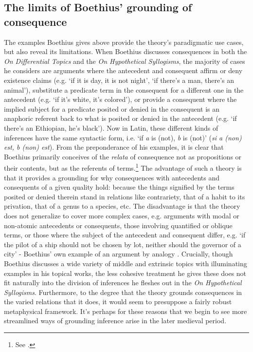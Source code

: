 \documentclass[a4paper, 11pt]{article}
\begin{document}
\subsection{The limits of Boethius' grounding of consequence}
The examples Boethius gives above provide the theory's paradigmatic use cases, but also reveal its limitations. When Boethius discusses consequences in both the \emph{On Differential Topics} and the \emph{On Hypothetical Syllogisms}, the majority of cases he considers are arguments where the antecedent and consequent affirm or deny existence claims (e.g. `if it is day, it is not night', `if there's a man, there's an animal'), substitute a predicate term in the consequent for a different one in the antecedent (e.g. `if it's white, it's colored'), or provide a consequent where the implied subject for a predicate posited or denied in the consequent is an anaphoric referent back to what is posited or denied in the antecedent (e.g. `if there's an Ethiopian, he's black'). Now in Latin, these different kinds of inferences have the same syntactic form, i.e.  `if \emph{a} is (not), \emph{b} is (not)' (\emph{si a (non) est, b (non) est}). From the preponderance of his examples, it is clear that Boethius primarily conceives of the \emph{relata} of consequence not as propositions or their contents, but as the referents of terms.\footnote{See \autocite{Martin2007,Bosman2018}.} The advantage of such a theory is that it provides a grounding for why consequences with antecedents and consequents of a given quality hold: because the things signified by the terms posited or denied therein stand in relations like contrariety, that of a habit to its privation, that of a genus to a species, etc. The disadvantage is that the theory does not generalize to cover more complex cases, e.g. arguments with modal or non-atomic antecedents or consequents, those involving quantified or oblique terms, or those where the subject of the antecedent and consequent differ, e.g. `if the pilot of a ship should not be chosen by lot, neither should the governor of a city' - Boethius' own example of an argument by analogy \autocite[1191A-B]{BDT}. Crucially, though Boethius discusses a wide variety of middle and extrinsic topics with illuminating examples in his topical works, the less cohesive treatment he gives these does not fit naturally into the division of inferences he fleshes out in the \emph{On Hypothetical Syllogisms}. Furthermore, to the degree that the theory grounds consequences in the varied relations that it does, it would seem to presuppose a fairly robust metaphysical framework. It's perhaps for these reasons that we begin to see more streamlined ways of grounding inference arise in the later medieval period.
\end{document}
